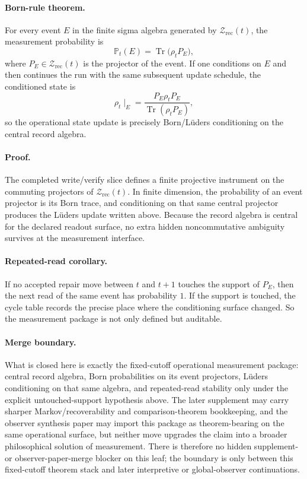\documentclass[11pt]{article}
\begin{document}
\paragraph{Born-rule theorem.}
For every event $E$ in the finite sigma algebra generated by $\mathcal Z_{\mathrm{rec}}(t)$, the
measurement probability is
\begin{equation}
\mathbb P_t(E)=\operatorname{Tr}\!\bigl(\rho_t P_E\bigr),
\end{equation}
where $P_E\in\mathcal Z_{\mathrm{rec}}(t)$ is the projector of the event. If one conditions on
$E$ and then continues the run with the same subsequent update schedule, the conditioned state is
\begin{equation}
\rho_t\!\mid_E
=
\frac{P_E\rho_t P_E}{\operatorname{Tr}(\rho_t P_E)},
\end{equation}
so the operational state update is precisely Born/L\"uders conditioning on the central record
algebra.

\paragraph{Proof.}
The completed write/verify slice defines a finite projective instrument on the commuting
projectors of $\mathcal Z_{\mathrm{rec}}(t)$. In finite dimension, the probability of an event
projector is its Born trace, and conditioning on that same central projector produces the
L\"uders update written above. Because the record algebra is central for the declared readout
surface, no extra hidden noncommutative ambiguity survives at the measurement interface.

\paragraph{Repeated-read corollary.}
If no accepted repair move between $t$ and $t+1$ touches the support of $P_E$, then the next
read of the same event has probability $1$. If the support is touched, the cycle table records
the precise place where the conditioning surface changed. So the measurement package is not only
defined but auditable.

\paragraph{Merge boundary.}
What is closed here is exactly the fixed-cutoff operational measurement package: central record
algebra, Born probabilities on its event projectors, L\"uders conditioning on that same algebra,
and repeated-read stability only under the explicit untouched-support hypothesis above. The
later supplement may carry sharper Markov/recoverability and comparison-theorem bookkeeping, and
the observer synthesis paper may import this package as theorem-bearing on the same operational
surface, but neither move upgrades the claim into a broader philosophical solution of
measurement. There is therefore no hidden supplement- or observer-paper-merge blocker on this
leaf; the boundary is only between this fixed-cutoff theorem stack and later interpretive or
global-observer continuations.
\end{document}
